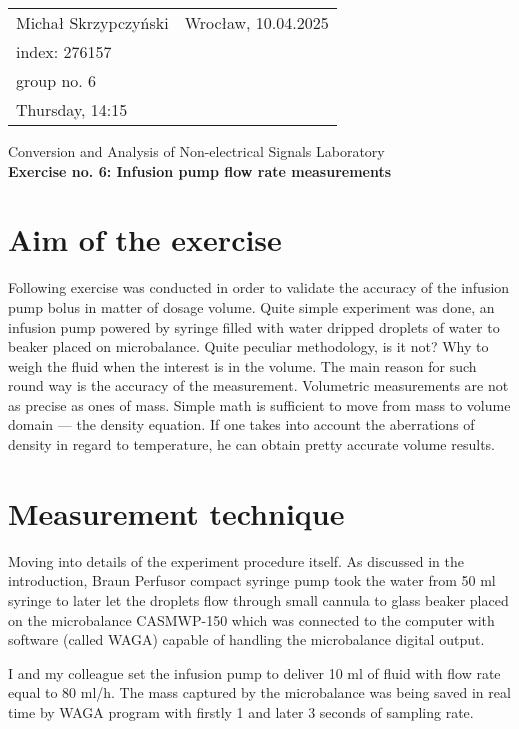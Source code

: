 \documentclass[12pt,a4paper]{article}
\makeatletter
\newcommand{\name}{}
\newcommand{\Sindex}{}
\newcommand{\group}{}
\newcommand{\class}{}
\newcommand{\dateplace}{}
\newcommand{\course}{}
\newcommand{\exTitle}{}
\renewcommand{\maketitle}{
	\begin{table}[]
		\centering
		\begin{tabular*}{\textwidth}{@{} l @{\extracolsep{\fill}} r @{}}
			\name & Wrocław, \dateplace \\
			index: \Sindex & \\
			group no. \group & \\
			Thursday, \class & \\
		\end{tabular*}
	\end{table}
	\begin{center}
		\course \\
		\vspace{.3cm}
		{\Large \bfseries \exTitle}
	\end{center}
	\vspace{-.3cm}
}
\makeatother
\begin{document}
	\renewcommand{\name}{Michał Skrzypczyński}
	\renewcommand{\Sindex}{276157}
	\renewcommand{\group}{6}
	\renewcommand{\class}{14:15}
	\renewcommand{\dateplace}{10.04.2025}
	\renewcommand{\course}{Conversion and Analysis of Non-electrical Signals Laboratory}
	\renewcommand{\exTitle}{Exercise no. 6: Infusion pump flow rate measurements}
	
	\maketitle
	\section{Aim of the exercise}
	Following exercise was conducted in order to validate the accuracy of the infusion pump bolus in matter of dosage volume. Quite simple experiment was done, an infusion pump powered by  syringe filled with water dripped droplets of water to beaker placed on microbalance. Quite peculiar methodology, is it not? Why to weigh the fluid when the interest is in the volume. The main reason for such round way is the accuracy of the measurement. Volumetric measurements are not as precise as ones of mass. Simple math is sufficient to move from mass to volume domain --- the density equation. If one takes into account the aberrations of density in regard to temperature, he can obtain pretty accurate volume results. 
	
	\section{Measurement technique}
	Moving into details of the experiment procedure itself. As discussed in the introduction, Braun Perfusor\textsuperscript{\tiny\textregistered} compact syringe pump took the water from 50 ml syringe to later let the droplets flow through small cannula to glass beaker placed on the microbalance CASMWP-150 which was connected to the computer with software (called WAGA) capable of handling the microbalance digital output.
	
	I and my colleague set the infusion pump to deliver 10 ml of fluid with flow rate equal to 80 ml/h. The mass captured by the microbalance was being saved in real time by WAGA program with firstly 1 and later 3 seconds of sampling rate.
	
\end{document}
